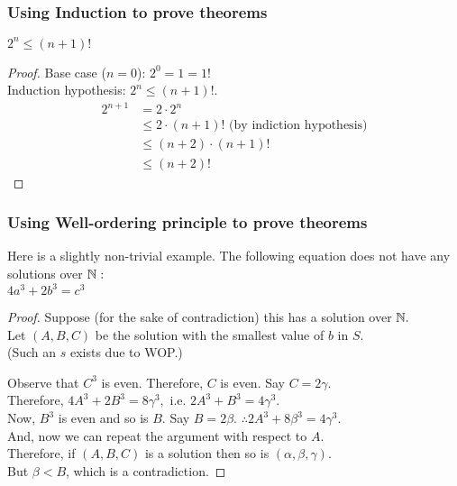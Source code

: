  \begin{frame}[fragile]
\frametitle{Using Induction to prove theorems}
\begin{theorem}
$2^n \leq (n+1)!$
\end{theorem}
\begin{proof}
Base case ($n=0$): $2^0 = 1 = 1!$\\

Induction hypothesis: $2^n \leq (n+1)!$. 
\begin{align*}
2^{n+1} & = 2 \cdot 2^n \\
& \leq 2 \cdot (n+1)! \mbox{     (by indiction hypothesis)}\\
& \leq (n+2) \cdot (n+1)! \\
& \leq (n+2)!
\end{align*}
\end{proof}
\end{frame}

 \begin{frame}[fragile]
\frametitle{Using Well-ordering principle to prove theorems}
Here is a slightly non-trivial example. The following equation does not have any solutions over ${{\mathbb{N}}}:$\\

$4a^3+2b^3 = c^3$


\begin{proof}
Suppose (for the sake of contradiction) this has a solution over ${{\mathbb{N}}}.$ \\
Let $(A,B,C)$ be the solution with the smallest value of $b$ in $S$. \\

(Such an $s$ exists due to WOP.) 

Observe that $C^3$ is even. Therefore, $C$ is even. Say $C = 2\gamma$. \\
Therefore, $4A^3 + 2B^3 = 8\gamma^3,$ i.e. $2A^3 + B^3 = 4\gamma^3$. \\

Now, $B^3$ is even and so is $B$. Say $B = 2\beta$. $\therefore 2A^3 + 8\beta^3 = 4\gamma^3$.\\

And, now we can repeat the argument with respect to $A$. \\
Therefore, if $(A,B,C)$ is a solution then so is $(\alpha, \beta, \gamma)$.\\

But $\beta < B$, which is a contradiction. 

\end{proof}


\end{frame}


